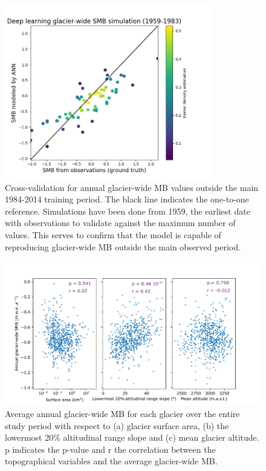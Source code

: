 {\begin{figure}[t]
\centering
\includegraphics[width=9cm]{Figures/past/Figure_S5.png}
\captionsetup{justification=centering}
\caption{Cross-validation for annual glacier-wide MB values outside the main 1984-2014 training period. The black line indicates the one-to-one reference. Simulations have been done from 1959, the earliest date with observations to validate against the maximum number of values. This serves to confirm that the model is capable of reproducing glacier-wide MB outside the main observed period.}
\label{past:figS5}
\end{figure}


\begin{figure}[t]
\centering
\includegraphics[width=16cm]{Figures/past/Figure_S6.pdf}
\captionsetup{justification=centering}
\caption{Average annual glacier-wide MB for each glacier over the entire study period with respect to (a) glacier surface area, (b) the lowermost 20\% altitudinal range slope and (c) mean glacier altitude. p indicates the p-value and r the correlation between the topographical variables and the average glacier-wide MB.}
\label{past:figS6}
\end{figure}


}
